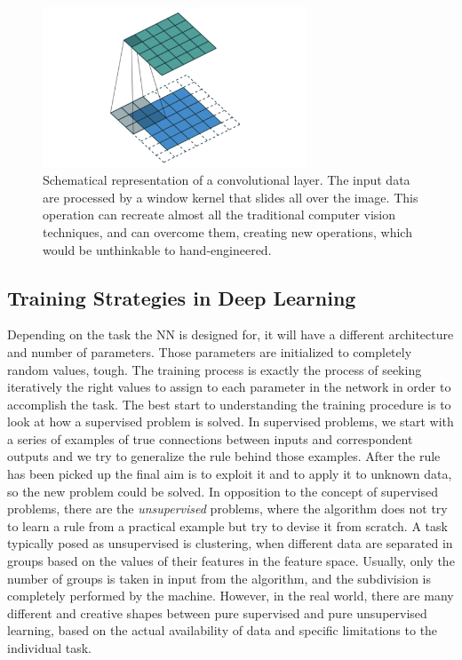\begin{figure}
    \centering
    \includegraphics[width = 0.7\textwidth]{images/CL}
    \caption{Schematical representation of a convolutional layer. The input data are processed by a window kernel that slides all over the image. This operation can recreate almost all the traditional computer vision techniques, and can overcome them, creating new operations, which would be unthinkable to hand-engineered.}
    \label{fig:convolutional}
\end{figure}

\subsection{Training Strategies in Deep Learning}
Depending on the task the NN is designed for, it will have a different architecture and number of parameters. Those parameters are initialized to completely random values, tough. The training process is exactly the process of seeking iteratively the right values to assign to each parameter in the network in order to accomplish the task. The best start to understanding the training procedure is to look at how a supervised problem is solved. In supervised problems, we start with a series of examples of true connections between inputs and correspondent outputs and we try to generalize the rule behind those examples. After the rule has been picked up the final aim is to exploit it and to apply it to unknown data, so the new problem could be solved. In opposition to the concept of supervised problems, there are the \textit{unsupervised} problems, where the algorithm does not try to learn a rule from a practical example but try to devise it from scratch. A task typically posed as unsupervised is clustering, when different data are separated in groups based on the values of their features in the feature space. Usually, only the number of groups is taken in input from the algorithm, and the subdivision is completely performed by the machine. However, in the real world, there are many different and creative shapes between pure supervised and pure unsupervised learning, based on the actual availability of data and specific limitations to the individual task.

